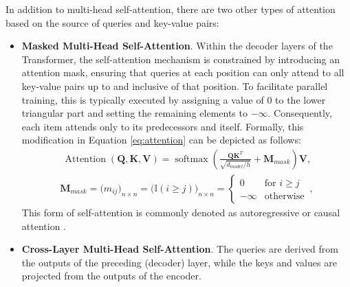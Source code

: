 In addition to multi-head self-attention, there are two other types of attention based on the source of queries and key-value pairs:
\begin{itemize}
    \item \textbf{Masked Multi-Head Self-Attention}. 
    Within the decoder layers of the Transformer, the self-attention mechanism is constrained by introducing an attention mask, ensuring that queries at each position can only attend to all key-value pairs up to and inclusive of that position. 
    To facilitate parallel training, this is typically executed by assigning a value of 0 to the lower triangular part and setting the remaining elements to $-\infty$. Consequently, each item attends only to its predecessors and itself. Formally, this modification in Equation \ref{eq:attention} can be depicted as follows:
    \begin{equation}\label{eq:attention_modified}
    \begin{aligned}
        \operatorname{Attention}(\mathbf{Q}, \mathbf{K}, \mathbf{V})=\operatorname{softmax}\left(\frac{\mathbf{Q}\mathbf{K}^T}{\sqrt{d_{model}/h}} + \mathbf{M}_{mask} \right)\mathbf{V},
    \end{aligned}
    \end{equation}
    \begin{equation}
    \begin{aligned}
        \mathbf{M}_{mask} = \Big(m_{ij}\Big)_{n\times n} = \Big(\mathbb{I}(i\ge j)\Big)_{n\times n} = 
        \begin{cases}
        0 & \text{for $i \ge j$ } \\
        -\infty & \text{otherwise}
        \end{cases},
    \end{aligned}
    \end{equation}
    This form of self-attention is commonly denoted as autoregressive or causal attention \cite{lin2022survey}.
    \item \textbf{Cross-Layer Multi-Head Self-Attention}. 
    The queries are derived from the outputs of the preceding (decoder) layer, while the keys and values are projected from the outputs of the encoder.
\end{itemize}

